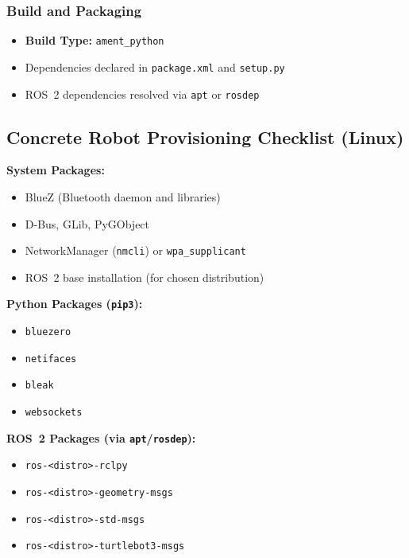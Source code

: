 \documentclass[11pt,a4paper]{article}
\begin{document}
\subsubsection{Build and Packaging}
\begin{itemize}
	\item \textbf{Build Type:} \texttt{ament\_python}
	\item Dependencies declared in \texttt{package.xml} and \texttt{setup.py}
	\item ROS~2 dependencies resolved via \texttt{apt} or \texttt{rosdep}
\end{itemize}

\subsection{Concrete Robot Provisioning Checklist (Linux)}
\textbf{System Packages:}
\begin{itemize}
	\item BlueZ (Bluetooth daemon and libraries)
	\item D-Bus, GLib, PyGObject
	\item NetworkManager (\texttt{nmcli}) or \texttt{wpa\_supplicant}
	\item ROS~2 base installation (for chosen distribution)
\end{itemize}

\textbf{Python Packages (\texttt{pip3}):}
\begin{itemize}
	\item \texttt{bluezero}
	\item \texttt{netifaces}
	\item \texttt{bleak}
	\item \texttt{websockets}
\end{itemize}

\textbf{ROS~2 Packages (via \texttt{apt}/\texttt{rosdep}):}
\begin{itemize}
	\item \texttt{ros-<distro>-rclpy}
	\item \texttt{ros-<distro>-geometry-msgs}
	\item \texttt{ros-<distro>-std-msgs}
	\item \texttt{ros-<distro>-turtlebot3-msgs}
\end{itemize}
\end{document}
